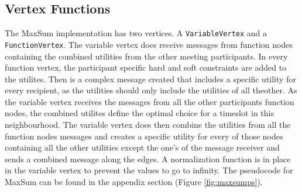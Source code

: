 \subsection{Vertex Functions} 
The MaxSum implementation has two vertices. A \texttt{VariableVertex} and a \texttt{FunctionVertex}. The variable vertex does receive messages from function nodes containing the combined utilities from the other meeting participants. In every function vertex, the participant specific hard and soft constraints are added to the utilites. Then is a complex message created that includes a specific utility for every recipient, as the utilities should only include the utilities of all theother. 
As the variable vertex receives the messages from all the other participants function nodes, the combined utilites define the optimal choice for a timeslot in this neighbourhood. The variable vertex does then combine the utilities from all the function nodes messages and creates a specific utility for every of those nodes containing all the other utilities except the one's of the message receiver and sends a combined message along the edges. A normalization function is in place in the variable vertex to prevent the values to go to infinity. The pseudocode for MaxSum can be found in the appendix section (Figure \ref{fig:maxsumps}).


